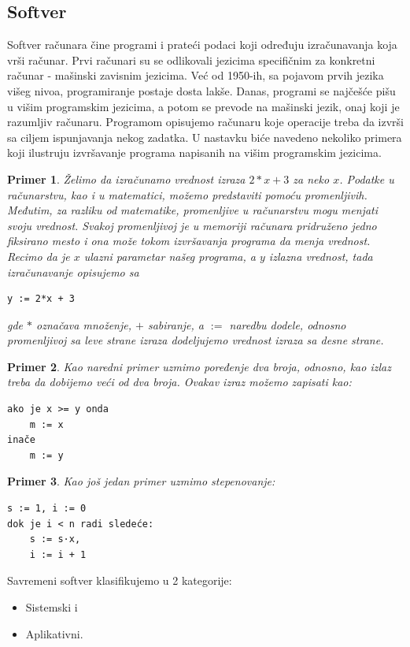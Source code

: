 \documentclass[a4paper]{article}
\newtheorem{primer}{Primer}[section]
\begin{document}
\subsection{Softver}
Softver računara čine programi i prateći podaci koji određuju izračunavanja koja vrši računar.
Prvi računari su se odlikovali jezicima specifičnim za konkretni računar - mašinski zavisnim jezicima. Već od 1950-ih, sa pojavom prvih jezika višeg nivoa, programiranje postaje dosta lakše. Danas, programi se najčešće pišu u višim programskim jezicima, a potom se prevode na mašinski jezik, onaj koji je razumljiv računaru. Programom opisujemo računaru koje operacije treba da izvrši sa ciljem ispunjavanja nekog zadatka. U nastavku biće navedeno nekoliko primera koji ilustruju izvršavanje programa napisanih na višim programskim jezicima. 
\begin{primer}
Želimo da izračunamo vrednost izraza $2*x + 3$ za neko $x$. Podatke u računarstvu, kao i u matematici, možemo predstaviti pomoću promenljivih. Međutim, za razliku od matematike, promenljive u računarstvu mogu menjati svoju vrednost. Svakoj promenljivoj je u memoriji računara pridruženo jedno fiksirano mesto i ona može tokom izvršavanja programa da menja vrednost. Recimo da je $x$ ulazni parametar našeg programa, a $y$ izlazna vrednost, tada izračunavanje opisujemo sa
\begin{verbatim}
y := 2*x + 3
\end{verbatim}
gde $*$ označava množenje, $+$ sabiranje, a $:=$ naredbu dodele, odnosno promenljivoj sa leve strane izraza dodeljujemo vrednost izraza sa desne strane.
\end{primer}
\begin{primer}
Kao naredni primer uzmimo poređenje dva broja, odnosno, kao izlaz treba da dobijemo veći od dva broja.
Ovakav izraz možemo zapisati kao:
\begin{verbatim}
ako je x >= y onda
    m := x
inače
    m := y
\end{verbatim}
\end{primer}
\begin{primer}
Kao još jedan primer uzmimo stepenovanje:
\begin{verbatim}
s := 1, i := 0
dok je i < n radi sledeće:
    s := s·x, 
    i := i + 1
\end{verbatim}
\end{primer}
Savremeni softver klasifikujemo u 2 kategorije:
\begin{itemize}
\item Sistemski i
\item Aplikativni.
\end{itemize}
\end{document}
